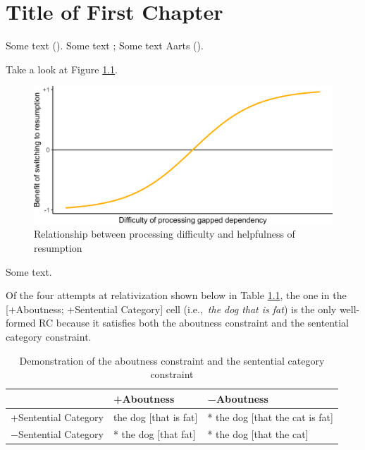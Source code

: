 \chapter{Title of First Chapter}

Some text (\cite{aarts2007}). Some text \textcite{aarts2007}; Some text Aarts (\citeyear{aarts2007}).

Take a look at Figure \ref{fig:sigmoid}.

\begin{figure}
\caption{Relationship between processing difficulty and helpfulness of resumption} \label{fig:sigmoid}
\raggedright{}
\includegraphics{image/sigmoid.png}
\vspace{-12pt}
\end{figure}

\noindent Some text.

\newpage

Of the four attempts at relativization shown below in Table \ref{tab:constraint}, the one in the [+Aboutness; +Sentential Category] cell (i.e.,~\textit{the dog that is fat}) is the only well-formed RC because it satisfies both the aboutness constraint and the sentential category constraint.

\begin{table}
\caption{Demonstration of the aboutness constraint and the sentential category constraint}\label{tab:constraint}
\raggedright{}
\begin{tabularx}{\linewidth}{XXX}\hline
& \phantom{* }+Aboutness & \phantom{* }−Aboutness\\\hline
+Sentential Category & \phantom{* }the dog [that is fat] & * the dog [that the cat is fat]\\
−Sentential Category & * the dog [that fat] & * the dog [that the cat]\\\hline
\end{tabularx}
\vspace{-12pt}
\end{table}

